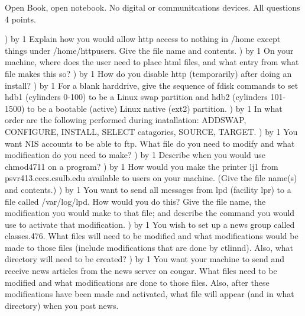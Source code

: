 
\parindent=0in
\nopagenumbers
\newcount\quesno
{}
\def\ques{\number\quesno) \advance\quesno by 1}
\def\aspace{\vskip 1.5in}

Open Book, open notebook. No digital or communitcations devices.
All questions 4 points.

\ques
Explain how you would allow http access to nothing in
{\ltt{}/home} except things under {\ltt{}/home/httpusers}.
Give the file name and contents.
\vskip 2.8in
\ques
On your machine, where does the user need to place html files,
and what entry from what file makes this so?
\vskip 1.0in
\ques
How do you disable http (temporarily) after doing an install?
\vskip 0.8in
\ques
For a blank harddrive,
give the sequence of {\ltt{}fdisk} commands to
set {\ltt{}hdb1} (cylinders 0-100)
to be a Linux swap partition
and {\ltt{}hdb2} (cylinders 101-1500)
to be a bootable (active) Linux native (ext2) partition.
\vfill\eject
\ques
In what order are the following performed during inatallation:
ADDSWAP, CONFIGURE, INSTALL, SELECT catagories, SOURCE, TARGET.
\vskip 1.8in
\ques
You want NIS accounts to be able to ftp.
What file do you need to modify and what modification do you need to make?
\vskip 1.0in
\ques
Describe when you would use {\ltt{}chmod4711} on a program?
\vskip 1.5in
\ques
How would you make the printer {\ltt{}lj1} from
{\ltt{}psvr413.cecs.csulb.edu} available to users on your machine.
(Give the file name(s) and contents.)
\vskip 1.0in
\ques
You want to send all messages from {\ltt{}lpd} (facility {\ltt{}lpr})
to a file called {\ltt{}/var/log/lpd}.
How would you do this?
Give the file name, the modification you would make to that file;
and describe the command you would use to activate that modification.
\vskip 1.0in
\vfill\eject
\ques
You wish to set up a news group called {\ltt{}classes.476}.
What files will need to be modified
and what modifications would be made to those files
(include modifications that are done by {\ltt{}ctlinnd}).
Also, what directory will need to be created?
\vskip 2.5in
\ques
You want your machine to send and receive news articles from
the news server on {\ltt{}cougar}.
What files need to be modified and what modifications are done
to those files.
Also, after these modifications have been made and activated,
what file will appear (and in what directory) when you post news.

